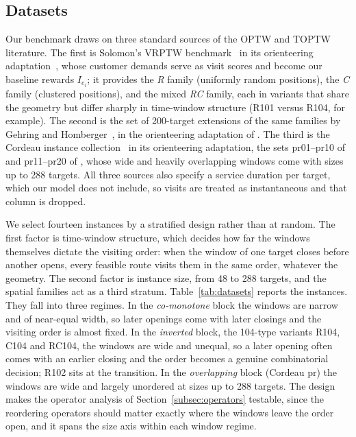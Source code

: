 \subsection{Datasets}\label{subsec:solomon}

Our benchmark draws on three standard sources of the OPTW and TOPTW literature. The first is Solomon's VRPTW benchmark~\cite{solomon1987algorithms} in its orienteering adaptation~\cite{righini2009decremental}, whose customer demands serve as visit scores and become our baseline rewards $I_{e_i}$; it provides the \emph{R} family (uniformly random positions), the \emph{C} family (clustered positions), and the mixed \emph{RC} family, each in variants that share the geometry but differ sharply in time-window structure (R101 versus R104, for example). The second is the set of 200-target extensions of the same families by Gehring and Homberger~\cite{gehring1999parallel}, in the orienteering adaptation of \citep{montemanni2009ant}. The third is the Cordeau instance collection~\cite{cordeau1997tabu} in its orienteering adaptation, the sets pr01--pr10 of \citep{montemanni2009ant} and pr11--pr20 of \citep{vansteenwegen2009iterated}, whose wide and heavily overlapping windows come with sizes up to 288 targets. All three sources also specify a service duration per target, which our model does not include, so visits are treated as instantaneous and that column is dropped.

We select fourteen instances by a stratified design rather than at random. The first factor is time-window structure, which decides how far the windows themselves dictate the visiting order: when the window of one target closes before another opens, every feasible route visits them in the same order, whatever the geometry. The second factor is instance size, from 48 to 288 targets, and the spatial families act as a third stratum. Table~\ref{tab:datasets} reports the instances. They fall into three regimes. In the \emph{co-monotone} block the windows are narrow and of near-equal width, so later openings come with later closings and the visiting order is almost fixed. In the \emph{inverted} block, the 104-type variants R104, C104 and RC104, the windows are wide and unequal, so a later opening often comes with an earlier closing and the order becomes a genuine combinatorial decision; R102 sits at the transition. In the \emph{overlapping} block (Cordeau pr) the windows are wide and largely unordered at sizes up to 288 targets. The design makes the operator analysis of Section~\ref{subsec:operators} testable, since the reordering operators should matter exactly where the windows leave the order open, and it spans the size axis within each window regime.

